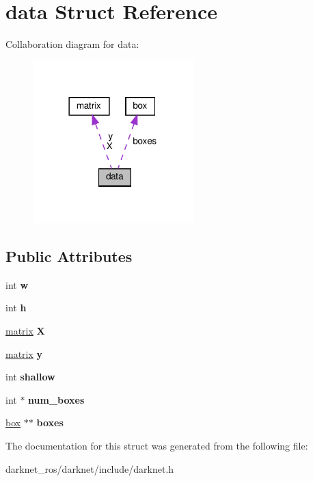 \hypertarget{structdata}{}\section{data Struct Reference}
\label{structdata}


Collaboration diagram for data\+:\nopagebreak
\begin{figure}[H]
\begin{center}
\leavevmode
\includegraphics[width=177pt]{structdata__coll__graph}
\end{center}
\end{figure}
\subsection*{Public Attributes}
\begin{DoxyCompactItemize}
\item 
\mbox{\label{structdata_a9de96028e1598b323d91ffb059cd48b2}} 
int {\bfseries w}
\item 
\mbox{\label{structdata_adbac4a041922ac9e6c47953f5fa23126}} 
int {\bfseries h}
\item 
\mbox{\label{structdata_a1f37ae26b26b12ef5c70a12957826e87}} 
\hyperlink{structmatrix}{matrix} {\bfseries X}
\item 
\mbox{\label{structdata_a30946bde3a05e40df6fbb49c5dd9b627}} 
\hyperlink{structmatrix}{matrix} {\bfseries y}
\item 
\mbox{\label{structdata_a3ef4c4e942b1f2b6a5e64e7fb7e12491}} 
int {\bfseries shallow}
\item 
\mbox{\label{structdata_afba4d3b06050db7a30b0b11809ae6e23}} 
int $\ast$ {\bfseries num\+\_\+boxes}
\item 
\mbox{\label{structdata_a8379df4ef55945c6fdb778dd581dce55}} 
\hyperlink{structbox}{box} $\ast$$\ast$ {\bfseries boxes}
\end{DoxyCompactItemize}


The documentation for this struct was generated from the following file\+:\begin{DoxyCompactItemize}
\item 
darknet\+\_\+ros/darknet/include/darknet.\+h\end{DoxyCompactItemize}
